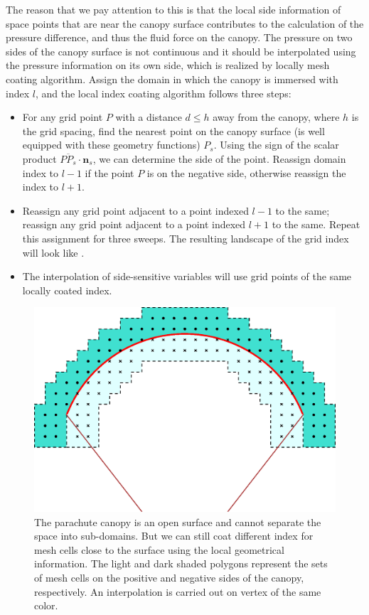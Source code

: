 The reason that we pay attention to this is that the local side information 
of space points that are near the canopy surface contributes to the 
calculation of the pressure difference, and thus the fluid force on the 
canopy. 
The pressure on two sides of the canopy surface is not continuous and it 
should be interpolated using the pressure information on its own side, which 
is realized by locally mesh coating algorithm.
Assign the domain in which the canopy is immersed with index $l$, and the 
local index coating algorithm follows three steps: 
\begin{itemize}
\item For any grid point $P$ with a distance $d \leq h$ away from the canopy, 
where $h$ is the grid spacing, find the nearest point on the canopy surface 
(\FronTierp is well equipped with these geometry functions) $P_{s}$. 
Using the sign of the scalar product $\overline{PP_{s}} \cdot \mathbf{n}_{s}$, 
we can determine the side of the point. 
Reassign domain index to $l-1$ if the point $P$ is on the negative side, 
otherwise reassign the index to $l+1$.
\item Reassign any grid point adjacent to a point indexed $l-1$ to the same; 
reassign any grid point adjacent to a point indexed $l+1$ to the same. 
Repeat this assignment for three sweeps. 
The resulting landscape of the grid index will look like . 
\item The interpolation of side-sensitive variables will use grid points of 
the same locally coated index.
\end{itemize}
\begin{figure}[!ht]
\centering
\includegraphics[width=0.7\columnwidth]{figures/local_coating}
\caption{The parachute canopy is an open surface and cannot separate the 
space into sub-domains. But we can still coat different index for mesh 
cells close to the surface using the local geometrical information. The 
light and dark shaded polygons represent the sets of mesh cells on the 
positive and negative sides of the canopy, respectively. An interpolation 
is carried out on vertex of the same color.}
\label{fig:local_coating}
\end{figure}



